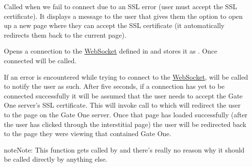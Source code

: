 \documentclass[letterpaper,10pt,openany]{sphinxmanual}
\begin{document}
\begin{fulllineitems}
\begin{fulllineitems}
\begin{fulllineitems}
\end{fulllineitems}



\begin{fulllineitems}
\label{Developer/js_gateone:GateOne.Net.sslError}
Called when we fail to connect due to an SSL error (user must accept the SSL certificate).  It displays a message to the user that gives them the option to open up a new page where they can accept the SSL certificate (it automatically redirects them back to the current page).

\end{fulllineitems}



\begin{fulllineitems}
\label{Developer/js_gateone:GateOne.Net.connect}
Opens a connection to the \href{https://developer.mozilla.org/en/WebSockets/WebSockets\_reference/WebSocket}{WebSocket} defined in  and stores it as .  Once connected {\hyperref[Developer/js_gateone:GateOne.initialize]{}} will be called.

If an error is encountered while trying to connect to the \href{https://developer.mozilla.org/en/WebSockets/WebSockets\_reference/WebSocket}{WebSocket}, {\hyperref[Developer/js_gateone:GateOne.Net.connectionError]{}} will be called to notify the user as such.  After five seconds, if a connection has yet to be connected successfully it will be assumed that the user needs to accept the Gate One server's SSL certificate.  This will invoke call to {\hyperref[Developer/js_gateone:GateOne.Net.sslError]{}} which will redirect the user to the  page on the Gate One server.  Once that page has loaded successfully (after the user has clicked through the interstitial page) the user will be redirected back to the page they were viewing that contained Gate One.

\begin{notice}{note}{Note:}
This function gets called by {\hyperref[Developer/js_gateone:GateOne.init]{}} and there's really no reason why it should be called directly by anything else.
\end{notice}

\end{fulllineitems}




\end{fulllineitems}
\end{fulllineitems}
\end{document}
